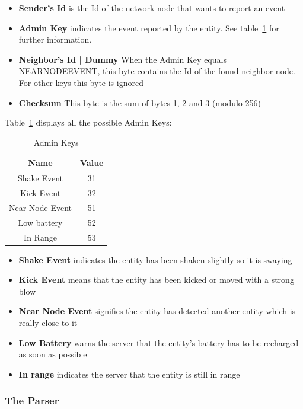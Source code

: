 \begin{itemize}
\item \textbf{Sender's Id} is the Id of the network node that wants to report an event
\item \textbf{Admin Key} indicates the event reported by the entity. See table~\ref{Admin Keys} for further information.
\item \textbf {Neighbor's Id | Dummy } When the Admin Key equals NEARNODEEVENT, this byte contains the Id of the found neighbor node. For other keys this byte is ignored
\item \textbf {Checksum} This byte is the sum of bytes 1, 2 and 3 (modulo 256)
\end{itemize}

Table~\ref{Admin Keys} displays all the possible Admin Keys:

\begin{table}[h]
  \centering
  \begin{tabular}{ c | c }
    \hline
    \textbf{Name} & \textbf{Value}\\ [0.5ex]    
    \hline
    Shake Event & 31 \\
    Kick Event  & 32 \\
    Near Node Event & 51\\
    Low battery & 52\\
    In Range & 53\\   
    \hline
  \end{tabular}
  \caption[Admin Keys]%
          {Admin Keys}
  \label{Admin Keys}
\end{table}

\begin{itemize}
\item \textbf {Shake Event} indicates the entity has been shaken slightly so it is swaying
\item \textbf {Kick Event} means that the entity has been kicked or moved with a strong blow
\item \textbf {Near Node Event} signifies the entity has detected another entity which is really close to it
\item \textbf {Low Battery} warns the server that the entity's battery has to be recharged as soon as possible
\item \textbf {In range} indicates the server that the entity is still in range
\end{itemize}




\subsubsection{The Parser}
 
